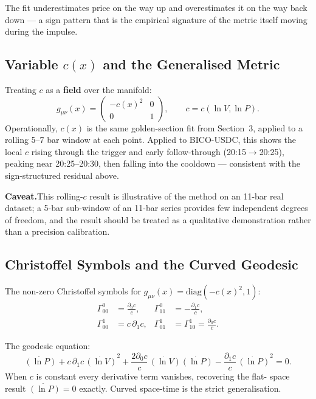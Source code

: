 \documentclass[12pt,a4paper]{article}
\begin{document}
The fit underestimates price on the way up and overestimates it on the
way back down --- a sign pattern that is the empirical signature of
the metric itself moving during the impulse.

\subsection{Variable \texorpdfstring{$c(x)$}{c(x)} and the Generalised Metric}

Treating $c$ as a \textbf{field} over the manifold:
\begin{equation}
    g_{\mu\nu}(x) = \begin{pmatrix} -c(x)^2 & 0 \\ 0 & 1 \end{pmatrix},
    \qquad c=c(\ln V,\ln P).
\end{equation}
Operationally, $c(x)$ is the same golden-section fit from Section~3,
applied to a rolling 5--7 bar window at each point. Applied to BICO-USDC,
this shows the local $c$ rising through the trigger and early
follow-through (20:15$\to$20:25), peaking near 20:25--20:30, then falling
into the cooldown --- consistent with the sign-structured residual above.

\textbf{Caveat.}\quad This rolling-$c$ result is illustrative of the
method on an 11-bar real dataset; a 5-bar sub-window of an 11-bar series
provides few independent degrees of freedom, and the result should be
treated as a qualitative demonstration rather than a precision
calibration.

\subsection{Christoffel Symbols and the Curved Geodesic}

The non-zero Christoffel symbols for $g_{\mu\nu}(x)=\text{diag}(-c(x)^2,1)$:
\begin{align}
    \Gamma^0_{00} &= \frac{\partial_0 c}{c}, &
    \Gamma^0_{11} &= -\frac{\partial_1 c}{c}, \\
    \Gamma^1_{00} &= c\,\partial_1 c, &
    \Gamma^1_{01} &= \Gamma^1_{10} = \frac{\partial_0 c}{c}.
\end{align}

The geodesic equation:
\begin{equation}
    \ddot{(\ln P)} + c\,\partial_1 c\,\dot{(\ln V)}^2
    + \frac{2\partial_0 c}{c}\,\dot{(\ln V)}\dot{(\ln P)}
    - \frac{\partial_1 c}{c}\,\dot{(\ln P)}^2 = 0.
\end{equation}
When $c$ is constant every derivative term vanishes, recovering the flat-
space result $\ddot{(\ln P)}=0$ exactly. Curved space-time is the strict
generalisation.
\end{document}
